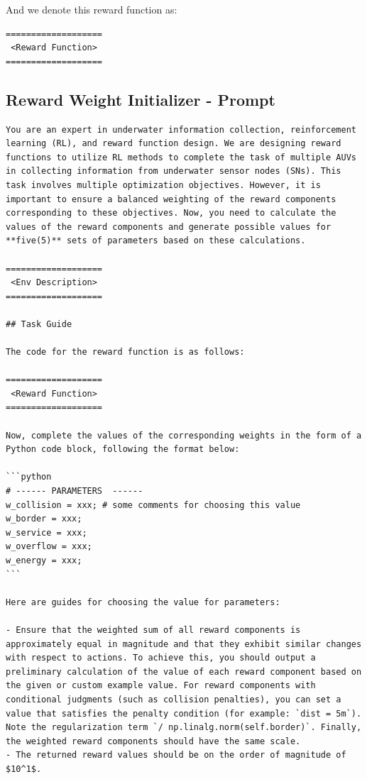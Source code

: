 \documentclass{article}
\begin{document}
And we denote this reward function as:
\begin{verbatim}
===================
 <Reward Function>
===================
\end{verbatim}




\subsection{Reward Weight Initializer - Prompt}

\begin{verbatim}
You are an expert in underwater information collection, reinforcement learning (RL), and reward function design. We are designing reward functions to utilize RL methods to complete the task of multiple AUVs in collecting information from underwater sensor nodes (SNs). This task involves multiple optimization objectives. However, it is important to ensure a balanced weighting of the reward components corresponding to these objectives. Now, you need to calculate the values of the reward components and generate possible values for **five(5)** sets of parameters based on these calculations.

===================
 <Env Description>
===================

## Task Guide

The code for the reward function is as follows:

===================
 <Reward Function>
===================

Now, complete the values of the corresponding weights in the form of a Python code block, following the format below:

```python
# ------ PARAMETERS  ------
w_collision = xxx; # some comments for choosing this value
w_border = xxx;
w_service = xxx;
w_overflow = xxx;
w_energy = xxx;
```

Here are guides for choosing the value for parameters:

- Ensure that the weighted sum of all reward components is approximately equal in magnitude and that they exhibit similar changes with respect to actions. To achieve this, you should output a preliminary calculation of the value of each reward component based on the given or custom example value. For reward components with conditional judgments (such as collision penalties), you can set a value that satisfies the penalty condition (for example: `dist = 5m`). Note the regularization term `/ np.linalg.norm(self.border)`. Finally, the weighted reward components should have the same scale.
- The returned reward values should be on the order of magnitude of $10^1$.


\end{verbatim}
\end{document}
